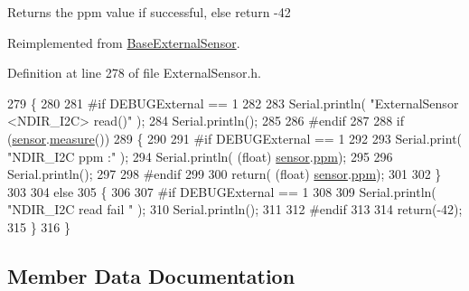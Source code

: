 \begin{DoxyReturn}{Returns}
the ppm value if successful, else return -\/42 
\end{DoxyReturn}


Reimplemented from \hyperlink{class_base_external_sensor_a1564f16deacf57b51b9948ac29db4291}{Base\+External\+Sensor}.



Definition at line 278 of file External\+Sensor.\+h.


\begin{DoxyCode}
279     \{
280         
281 \textcolor{preprocessor}{    #if DEBUGExternal == 1 }
282         
283         Serial.println( \textcolor{stringliteral}{"ExternalSensor <NDIR\_I2C> read()"} );
284         Serial.println();
285 
286 \textcolor{preprocessor}{    #endif}
287 
288         \textcolor{keywordflow}{if} (\hyperlink{class_external_sensor_3_01_n_d_i_r___i2_c_01_4_ae541c9cece7c38674b70114cdb74a7dc}{sensor}.\hyperlink{class_n_d_i_r___i2_c_ab8f50d38501d498b802b822bd4844ede}{measure}())
289         \{
290         
291 \textcolor{preprocessor}{        #if DEBUGExternal == 1 }
292 
293             Serial.print( \textcolor{stringliteral}{"NDIR\_I2C ppm :"} );
294             Serial.println( (\textcolor{keywordtype}{float}) \hyperlink{class_external_sensor_3_01_n_d_i_r___i2_c_01_4_ae541c9cece7c38674b70114cdb74a7dc}{sensor}.\hyperlink{class_n_d_i_r___i2_c_a7e5cfc725dba0f9c2bd1bd5ab3bb8600}{ppm});
295             
296             Serial.println();           
297 
298 \textcolor{preprocessor}{        #endif}
299 
300             \textcolor{keywordflow}{return}( (\textcolor{keywordtype}{float}) \hyperlink{class_external_sensor_3_01_n_d_i_r___i2_c_01_4_ae541c9cece7c38674b70114cdb74a7dc}{sensor}.\hyperlink{class_n_d_i_r___i2_c_a7e5cfc725dba0f9c2bd1bd5ab3bb8600}{ppm});
301             
302         \}
303         
304         \textcolor{keywordflow}{else}
305         \{
306         
307 \textcolor{preprocessor}{        #if DEBUGExternal == 1 }
308 
309             Serial.println( \textcolor{stringliteral}{"NDIR\_I2C read fail "} );
310             Serial.println();
311         
312 \textcolor{preprocessor}{        #endif}
313 
314             \textcolor{keywordflow}{return}(-42);
315         \}
316     \}
\end{DoxyCode}


\subsection{Member Data Documentation}
\mbox{\label{class_external_sensor_3_01_n_d_i_r___i2_c_01_4_ae541c9cece7c38674b70114cdb74a7dc}} 
